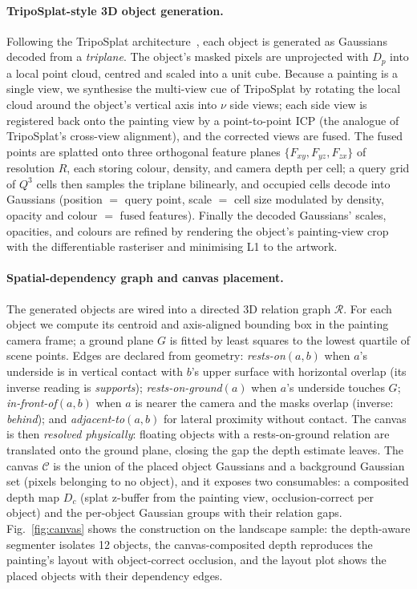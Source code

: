 \paragraph{TripoSplat-style 3D object generation.}
Following the TripoSplat architecture~\cite{triposplat2025}, each object is
generated as Gaussians decoded from a \emph{triplane}. The object's masked
pixels are unprojected with $D_p$ into a local point cloud, centred and
scaled into a unit cube. Because a painting is a single view, we synthesise
the multi-view cue of TripoSplat by rotating the local cloud around the
object's vertical axis into $\nu$ side views; each side view is registered
back onto the painting view by a point-to-point ICP (the analogue of
TripoSplat's cross-view alignment), and the corrected views are fused. The
fused points are splatted onto three orthogonal feature planes
$\{F_{xy}, F_{yz}, F_{zx}\}$ of resolution $R$, each storing colour, density,
and camera depth per cell; a query grid of $Q^3$ cells then samples the
triplane bilinearly, and occupied cells decode into Gaussians
(position $=$ query point, scale $=$ cell size modulated by density, opacity
and colour $=$ fused features). Finally the decoded Gaussians' scales,
opacities, and colours are refined by rendering the object's painting-view
crop with the differentiable rasteriser and minimising L1 to the artwork.

\paragraph{Spatial-dependency graph and canvas placement.}
The generated objects are wired into a directed 3D relation graph
$\mathcal{R}$. For each object we compute its centroid and axis-aligned
bounding box in the painting camera frame; a ground plane $G$ is fitted by
least squares to the lowest quartile of scene points. Edges are declared
from geometry: \emph{rests-on}$(a,b)$ when $a$'s underside is in vertical
contact with $b$'s upper surface with horizontal overlap (its inverse
reading is \emph{supports}); \emph{rests-on-ground}$(a)$ when $a$'s
underside touches $G$; \emph{in-front-of}$(a,b)$ when $a$ is nearer the
camera and the masks overlap (inverse: \emph{behind}); and
\emph{adjacent-to}$(a,b)$ for lateral proximity without contact. The canvas
is then \emph{resolved physically}: floating objects with a
rests-on-ground relation are translated onto the ground plane, closing the
gap the depth estimate leaves. The canvas $\mathcal{C}$ is the union of the
placed object Gaussians and a background Gaussian set (pixels belonging to
no object), and it exposes two consumables: a composited depth map $D_c$
(splat z-buffer from the painting view, occlusion-correct per object) and
the per-object Gaussian groups with their relation gaps.
Fig.~\ref{fig:canvas} shows the construction on the landscape sample:
the depth-aware segmenter isolates 12 objects, the canvas-composited depth
reproduces the painting's layout with object-correct occlusion, and the
layout plot shows the placed objects with their dependency edges.


